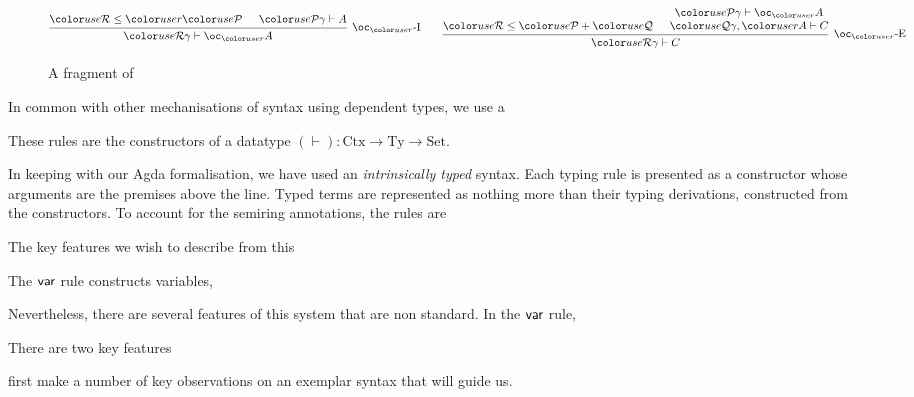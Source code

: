 \begin{figure}
\begin{displaymath}
  \end{displaymath}
  \begin{displaymath}
    \begin{prooftree}
      \hypo{\grR \leq \gr r\grP}
      \hypo{\grP\gamma \vdash A}
      \infer2[$\oc_{\gr r}$-I]{\grR\gamma \vdash \oc_{\gr r} A}
    \end{prooftree}
    \qquad
    \begin{prooftree}
      \hypo{\grR \leq \grP + \grQ}
      \hypo{\grP\gamma \vdash \oc_{\gr r} A}
      \infer[no rule]1{\grQ\gamma, \gr rA \vdash C}
      \infer2[$\oc_{\gr r}$-E]{\grR\gamma \vdash C}
    \end{prooftree}
  \end{displaymath}
  \caption{A fragment of \name{}}\label{fig:lr}
\end{figure}

In common with other mechanisations of syntax using dependent types,
we use a

These rules are the constructors of a datatype
$(\vdash) : \mathrm{Ctx} \to \mathrm{Ty} \to \mathrm{Set}$.



In keeping with our Agda formalisation, we have used an
\emph{intrinsically typed} syntax. Each typing rule is presented as a
constructor whose arguments are the premises above the line. Typed
terms are represented as nothing more than their typing derivations,
constructed from the constructors. To account for the semiring
annotations, the rules are

The key features we wish to describe from this

The $\mathsf{var}$ rule constructs variables,

Nevertheless, there are several features of this system that are non
standard. In the $\mathsf{var}$ rule,

There are two key features



first make a number of key observations on an exemplar syntax that
will guide us.

